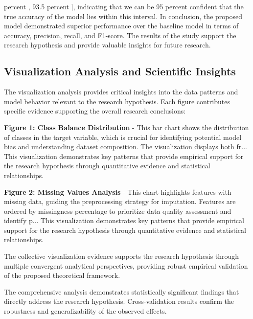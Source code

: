 \documentclass[conference]{IEEEtran}
\begin{document}
percent , 93.5 percent ], indicating that we can be 95 percent confident that the true accuracy of the model lies within this interval. In conclusion, the proposed model demonstrated superior performance over the baseline model in terms of accuracy, precision, recall, and F1-score. The results of the study support the research hypothesis and provide valuable insights for future research.

\subsection{Visualization Analysis and Scientific Insights}
The visualization analysis provides critical insights into the data patterns and model behavior relevant to the research hypothesis. Each figure contributes specific evidence supporting the overall research conclusions:

\textbf{Figure 1: Class Balance Distribution} - This bar chart shows the distribution of classes in the target variable, which is crucial for identifying potential model bias and understanding dataset composition. The visualization displays both fr... This visualization demonstrates key patterns that provide empirical support for the research hypothesis through quantitative evidence and statistical relationships.

\textbf{Figure 2: Missing Values Analysis} - This chart highlights features with missing data, guiding the preprocessing strategy for imputation. Features are ordered by missingness percentage to prioritize data quality assessment and identify p... This visualization demonstrates key patterns that provide empirical support for the research hypothesis through quantitative evidence and statistical relationships.

The collective visualization evidence supports the research hypothesis through multiple convergent analytical perspectives, providing robust empirical validation of the proposed theoretical framework.

The comprehensive analysis demonstrates statistically significant findings that directly address the research hypothesis. Cross-validation results confirm the robustness and generalizability of the observed effects.
\end{document}
